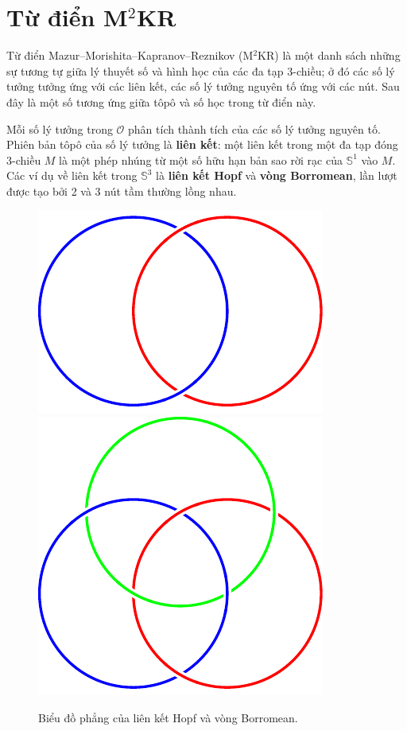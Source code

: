 \documentclass[12pt]{article}
\begin{document}
\section{Từ điển M$^2$KR}

Từ điển Mazur--Morishita--Kapranov--Reznikov (M$^2$KR) là một danh sách những sự tương tự giữa lý thuyết số và hình học của các đa tạp 3-chiều; ở đó các số lý tưởng tưởng ứng với các liên kết, các số lý tưởng nguyên tố ứng với các nút. Sau đây là một số tương ứng giữa tôpô và số học trong từ điển này.

Mỗi số lý tưởng trong $\mathcal{O}$ phân tích thành tích của các số lý tưởng nguyên tố. Phiên bản tôpô của số lý tưởng là {\bf liên kết}: một liên kết trong một đa tạp đóng $3$-chiều $M$ là một phép nhúng từ một số hữu hạn bản sao rời rạc của $\mathbb{S}^1$ vào $M$. Các ví dụ về liên kết trong $\mathbb{S}^3$ là {\bf liên kết Hopf} và {\bf vòng Borromean}, lần lượt được tạo bởi 2 và 3 nút tầm thường lồng nhau.
\begin{figure}[h!]
    \centering
    \includegraphics[scale = 1]{hopf.pdf} \hspace{2cm}
    \includegraphics[scale = 1]{borromean.pdf}
    \caption{Biểu đồ phẳng của liên kết Hopf và vòng Borromean.}
    \label{h11}
\end{figure}
\end{document}
